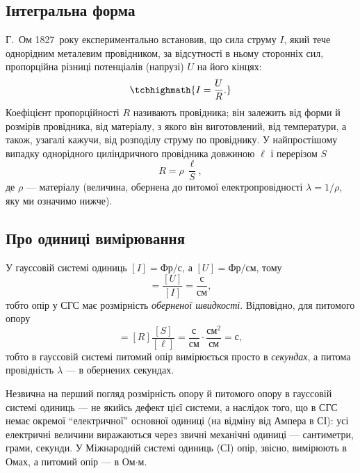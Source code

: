 \subsection*{Інтегральна форма}

Г.~Ом 1827~року експериментально встановив, що сила струму $I$, який тече однорідним металевим провідником, за відсутності в ньому сторонніх сил,
пропорційна різниці потенціалів (напрузі) $U$ на його кінцях:
\begin{equation}\label{eq:OhmIntegral}
	\tcbhighmath{
		I = \frac{U}{R}.
	}
\end{equation}
Коефіцієнт пропорційності $R$ називають  провідника; він залежить від форми й розмірів провідника, від матеріалу, з якого
він виготовлений, від температури, а також, узагалі кажучи, від розподілу струму по провіднику. У найпростішому випадку однорідного циліндричного
провідника довжиною $\ell$ і перерізом $S$
\begin{equation}\label{eq:ResistanceCylinder}
	R = \rho\, \frac{\ell}{S},
\end{equation}
де $\rho$ ---  матеріалу (величина, обернена до питомої електропровідності $\lambda = 1/\rho$, яку ми означимо нижче).

\subsection*{Про одиниці вимірювання}

У гауссовій системі одиниць $[I] = \text{Фр}/\text{с}$, а $[U] = \text{Фр}/\text{см}$, тому
\begin{equation*}
	[R] = \frac{[U]}{[I]} = \frac{\text{с}}{\text{см}},
\end{equation*}
тобто опір у СГС має розмірність \emph{оберненої швидкості}. Відповідно, для питомого опору
\begin{equation*}
	[\rho] = [R]\frac{[S]}{[\ell]} = \frac{\text{с}}{\text{см}}\cdot\frac{\text{см}^2}{\text{см}} = \text{с},
\end{equation*}
тобто в гауссовій системі питомий опір вимірюється просто в \emph{секундах}, а питома провідність $\lambda$ --- в обернених секундах.

\begin{Attention}
	Незвична на перший погляд розмірність опору й питомого опору в гауссовій системі одиниць --- не якийсь дефект цієї системи, а наслідок того, що
	в СГС немає окремої \enquote{електричної} основної одиниці (на відміну від Ампера в СІ): усі електричні величини виражаються через звичні механічні
	одиниці --- сантиметри, грами, секунди. У Міжнародній системі одиниць (СІ) опір, звісно, вимірюють в Омах, а питомий опір --- в Ом$\cdot$м.
\end{Attention}

